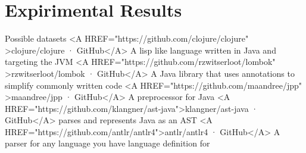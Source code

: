 
\chapter{Expirimental Results}


Possible datasets
<A HREF="https://github.com/clojure/clojure" >clojure/clojure · GitHub</A>
A lisp like language written in Java and targeting the JVM
<A HREF="https://github.com/rzwitserloot/lombok" >rzwitserloot/lombok · GitHub</A>
A Java library that uses annotations to simplify commonly written code
<A HREF="https://github.com/maandree/jpp" >maandree/jpp · GitHub</A>
A preprocessor for Java
<A HREF="https://github.com/klangner/ast-java">klangner/ast-java · GitHub</A>
parses and represents Java as an AST
<A HREF="https://github.com/antlr/antlr4">antlr/antlr4 · GitHub</A>
A parser for any language you have language definition for


 







